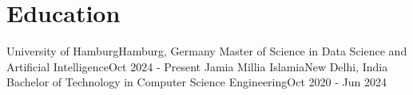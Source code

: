 \section{Education}
  \resumeSubHeadingListStart
    \resumeSubheading
      {University of Hamburg}{Hamburg, Germany}
      {Master of Science in Data Science and Artificial Intelligence}{Oct 2024 - Present}
  \resumeSubHeadingListEnd
  \vspace{-10pt}
  \resumeSubHeadingListStart
    \resumeSubheading
      {Jamia Millia Islamia}{New Delhi, India}
      {Bachelor of Technology in Computer Science Engineering}{Oct 2020 - Jun 2024}
  \resumeSubHeadingListEnd
